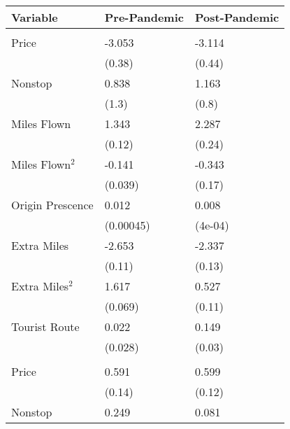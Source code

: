 
\begin{tabular}[t]{lll}
\toprule
Variable & Pre-Pandemic & Post-Pandemic\\
\midrule
\addlinespace[0.3em]
\multicolumn{3}{l}{\textbf{Linear Coefficients}}\\
\hspace{1em}Price & -3.053 & -3.114\\
\hspace{1em} & (0.38) & (0.44)\\
\hspace{1em}Nonstop & 0.838 & 1.163\\
\hspace{1em} & (1.3) & (0.8)\\
\hspace{1em}Miles Flown & 1.343 & 2.287\\
\hspace{1em} & (0.12) & (0.24)\\
\hspace{1em}Miles Flown$^2$ & -0.141 & -0.343\\
\hspace{1em} & (0.039) & (0.17)\\
\hspace{1em}Origin Prescence & 0.012 & 0.008\\
\hspace{1em} & (0.00045) & (4e-04)\\
\hspace{1em}Extra Miles & -2.653 & -2.337\\
\hspace{1em} & (0.11) & (0.13)\\
\hspace{1em}Extra Miles$^2$ & 1.617 & 0.527\\
\hspace{1em} & (0.069) & (0.11)\\
\hspace{1em}Tourist Route & 0.022 & 0.149\\
\hspace{1em} & (0.028) & (0.03)\\
\midrule
\addlinespace[0.3em]
\multicolumn{3}{l}{\textbf{Nonlinear Coefficients}}\\
\hspace{1em}Price & 0.591 & 0.599\\
\hspace{1em} & (0.14) & (0.12)\\
\hspace{1em}Nonstop & 0.249 & 0.081\\

\end{tabular}
